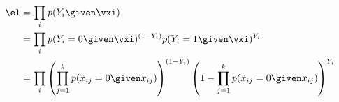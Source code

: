 \begin{align*}
    \el &= \prod_i p(Y_i \given \vxi)\\
        &= \prod_i p(Y_i = 0 \given \vxi)^{(1 - Y_i)} p(Y_i = 1 \given \vxi )^{Y_i}\\
        &= \prod_i  \left(\prod_{j=1}^k p(\Tilde{x}_{ij} = 0 \given x_{ij})\right)^{(1 - Y_i)} \left(1 - \prod_{j=1}^k  p(\Tilde{x}_{ij} = 0 \given x_{ij}) \right)^{Y_i}
\end{align*}